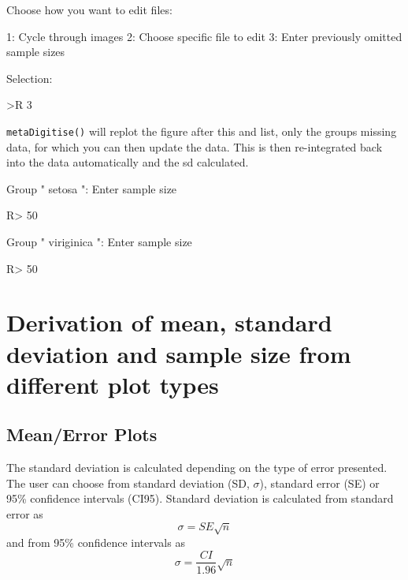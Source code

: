\documentclass[12pt]{article}
\newcommand{\fct}[1]{\texttt{#1()}}
\begin{document}
\begin{CodeChunk}
\begin{CodeOutput}
Choose how you want to edit files:

1: Cycle through images
2: Choose specific file to edit
3: Enter previously omitted sample sizes

Selection:
\end{CodeOutput}
\begin{CodeInput}
>R 3
\end{CodeInput}
\end{CodeChunk}

\fct{metaDigitise} will replot the figure after this and list, only the groups missing data, for which you can then update the data. This is then re-integrated back into the data automatically and the sd calculated. 

\begin{CodeChunk}
\begin{CodeOutput}
Group " setosa ": Enter sample size  
\end{CodeOutput}
\begin{CodeInput}
R> 50
\end{CodeInput}
\begin{CodeOutput}
Group " viriginica ": Enter sample size
\end{CodeOutput}
\begin{CodeInput}
R> 50
\end{CodeInput}
\end{CodeChunk}


\clearpage

\section{Derivation of mean, standard deviation and sample size from different plot types}

\subsection{Mean/Error Plots}
The standard deviation is calculated depending on the type of error presented. The user can choose from standard deviation (SD, $\sigma$), standard error (SE) or 95\% confidence intervals (CI95). Standard deviation is calculated from standard error as
\begin{equation}
\sigma = SE \sqrt{n}
\end{equation}
and from 95\% confidence intervals as
\begin{equation}
\sigma = \frac{CI}{1.96} \sqrt{n}
\end{equation}
\end{document}
